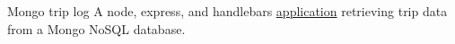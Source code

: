 {Mongo trip log}
{}
{A node, express, and handlebars \href{https://github.com/jacobarchambault/mongotripdata}{application} retrieving trip data from a Mongo NoSQL database.}

